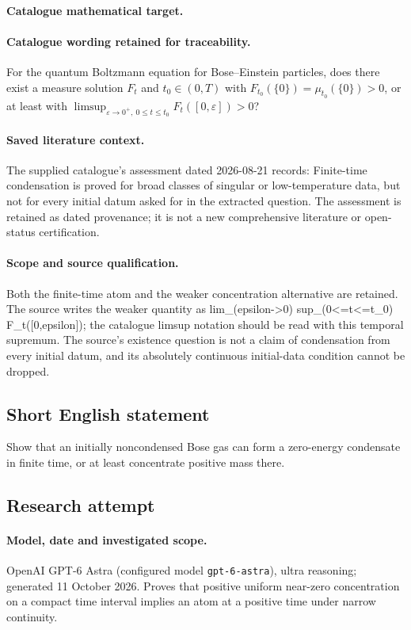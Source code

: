 \documentclass[11pt]{article}
\begin{document}
\paragraph{Catalogue mathematical target.}
\paragraph{Catalogue wording retained for traceability.}
For the quantum Boltzmann equation for Bose–Einstein particles, does there exist a measure solution $F_t$ and $t_0\in(0,T)$ with $F_{t_0}(\{0\})=\mu_{t_0}(\{0\})>0$, or at least with $\limsup_{\varepsilon\to0^+,\ 0\leq t\leq t_0}F_t([0,\varepsilon])>0$?

\paragraph{Saved literature context.} The supplied catalogue's assessment dated 2026-08-21 records: Finite-time condensation is proved for broad classes of singular or low-temperature data, but not for every initial datum asked for in the extracted question. The assessment is retained as dated provenance; it is not a new comprehensive literature or open-status certification.
\paragraph{Scope and source qualification.}Both the finite-time atom and the weaker concentration alternative are retained. The source writes the weaker quantity as lim_(epsilon->0) sup_(0<=t<=t_0) F_t([0,epsilon]); the catalogue limsup notation should be read with this temporal supremum. The source's existence question is not a claim of condensation from every initial datum, and its absolutely continuous initial-data condition cannot be dropped.
\subsection{Short English statement}
Show that an initially noncondensed Bose gas can form a zero-energy condensate in finite time, or at least concentrate positive mass there.
\subsection{Research attempt}
\paragraph{Model, date and investigated scope.}
OpenAI GPT-6 Astra (configured model \texttt{gpt-6-astra}), ultra reasoning; generated 11 October 2026. Proves that positive uniform near-zero concentration on a compact time interval implies an atom at a positive time under narrow continuity.
\end{document}
